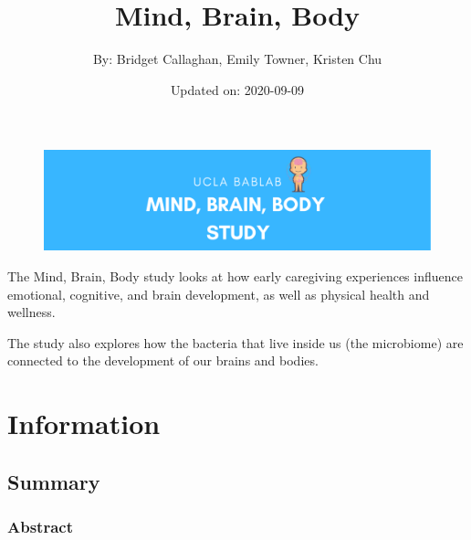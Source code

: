 \documentclass[]{book}
\title{Mind, Brain, Body}
\author{By: Bridget Callaghan, Emily Towner, Kristen Chu}
\date{Updated on: 2020-09-09}
\begin{document}
\maketitle

{
\setcounter{tocdepth}{1}
\tableofcontents
}
\hypertarget{section}{%
\chapter{}\label{section}}

\begin{figure}
\centering
\includegraphics{images/index/banner.png}
\caption{}
\end{figure}

The Mind, Brain, Body study looks at how early caregiving experiences influence emotional, cognitive, and brain development, as well as physical health and wellness.

The study also explores how the bacteria that live inside us (the microbiome) are connected to the development of our brains and bodies.

\hypertarget{information}{%
\chapter{Information}\label{information}}

\hypertarget{summary}{%
\section{Summary}\label{summary}}

\hypertarget{abstract}{%
\subsection{Abstract}\label{abstract}}
\end{document}

